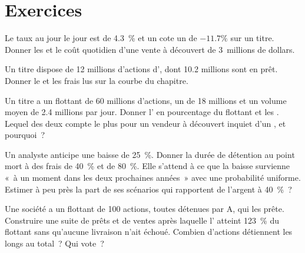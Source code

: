 \section{Exercices}

\begin{exercise}[$\star$]\label{exo:m1:stock-loan-and-short-selling:1}
Le taux au jour le jour est de 4.3~\% et un  cote un  de $-11.7\%$ sur
un titre. Donner les  et le coût quotidien d'une vente à découvert de 3~millions de dollars.
\end{exercise}

\begin{exercise}[$\star$]\label{exo:m1:stock-loan-and-short-selling:2}
Un titre dispose de 12 millions d'actions d', dont 10.2 millions
sont en prêt. Donner le  et les frais lus sur la courbe du chapitre.
\end{exercise}

\begin{exercise}[$\star$]\label{exo:m1:stock-loan-and-short-selling:3}
Un titre a un flottant de 60 millions d'actions, un  de 18 millions et
un volume moyen de 2.4 millions par jour. Donner l' en
pourcentage du flottant et les . Lequel des deux compte le plus pour
un vendeur à découvert inquiet d'un , et pourquoi~?
\end{exercise}

\begin{exercise}[$\star\star$]\label{exo:m1:stock-loan-and-short-selling:4}
Un analyste anticipe une baisse de 25~\%. Donner la durée de détention au point mort à des frais
de 40~\% et de 80~\%. Elle s'attend à ce que la baisse survienne «~à un moment dans les deux
prochaines années~» avec une probabilité uniforme. Estimer à peu près la part de ses scénarios
qui rapportent de l'argent à 40~\%~?
\end{exercise}

\begin{exercise}[$\star\star$]\label{exo:m1:stock-loan-and-short-selling:5}
Une société a un flottant de 100 actions, toutes détenues par A, qui les prête. Construire
une suite de prêts et de ventes après laquelle l' atteint 123~\% du
flottant sans qu'aucune livraison n'ait échoué. Combien d'actions détiennent les longs
au total~? Qui vote~?
\end{exercise}

